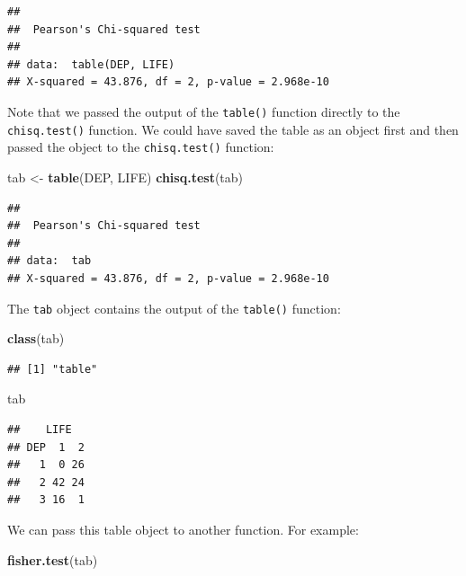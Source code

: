 \documentclass[12pt,]{book}
\newenvironment{Shaded}{\begin{snugshade}}{\end{snugshade}}
\newcommand{\KeywordTok}[1]{\textcolor[rgb]{0.13,0.29,0.53}{\textbf{#1}}}
\newcommand{\StringTok}[1]{\textcolor[rgb]{0.31,0.60,0.02}{#1}}
\newcommand{\NormalTok}[1]{#1}
\theoremstyle{definition}
\theoremstyle{definition}
\theoremstyle{definition}
\theoremstyle{remark}
\begin{document}
\begin{verbatim}
## 
##  Pearson's Chi-squared test
## 
## data:  table(DEP, LIFE)
## X-squared = 43.876, df = 2, p-value = 2.968e-10
\end{verbatim}

Note that we passed the output of the \texttt{table()} function directly
to the \texttt{chisq.test()} function. We could have saved the table as
an object first and then passed the object to the \texttt{chisq.test()}
function:

\begin{Shaded}
\begin{Highlighting}[]
\NormalTok{tab <-}\StringTok{ }\KeywordTok{table}\NormalTok{(DEP, LIFE)}
\KeywordTok{chisq.test}\NormalTok{(tab)}
\end{Highlighting}
\end{Shaded}

\begin{verbatim}
## 
##  Pearson's Chi-squared test
## 
## data:  tab
## X-squared = 43.876, df = 2, p-value = 2.968e-10
\end{verbatim}

The \texttt{tab} object contains the output of the \texttt{table()}
function:

\begin{Shaded}
\begin{Highlighting}[]
\KeywordTok{class}\NormalTok{(tab)}
\end{Highlighting}
\end{Shaded}

\begin{verbatim}
## [1] "table"
\end{verbatim}

\begin{Shaded}
\begin{Highlighting}[]
\NormalTok{tab}
\end{Highlighting}
\end{Shaded}

\begin{verbatim}
##    LIFE
## DEP  1  2
##   1  0 26
##   2 42 24
##   3 16  1
\end{verbatim}

We can pass this table object to another function. For example:

\begin{Shaded}
\begin{Highlighting}[]
\KeywordTok{fisher.test}\NormalTok{(tab)}
\end{Highlighting}
\end{Shaded}
\end{document}
